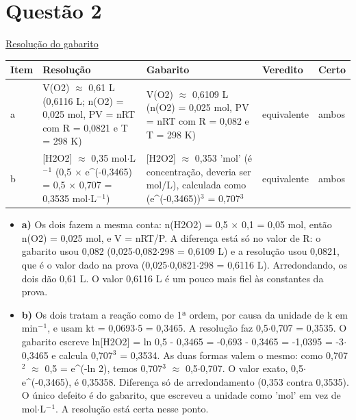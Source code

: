 \documentclass{article}%
\begin{document}
\section*{Questão 2}%
\href{https://poliedroresolve.sistemapoliedro.com.br/vestibulares/ita/2026/ita-2-fase-dia-2-29-10-2025-2-fase-dia-2/dissertativa-2-quimica-2-fase-dia-2-ita-2026}{Resolução do gabarito}\par\smallskip%
\begin{longtable}{@{}p{} p{} p{} p{} p{}@{}}\toprule Item & Resolução & Gabarito & Veredito & Certo \\ \midrule
a & V(O2) $\approx$ 0,61 L (0,6116 L; n(O2) = 0,025 mol, PV = nRT com R = 0,0821 e T = 298 K) & V(O2) $\approx$ 0,6109 L (n(O2) = 0,025 mol, PV = nRT com R = 0,082 e T = 298 K) & equivalente & ambos \\
b & {[}H2O2{]} $\approx$ 0,35 mol$\cdot$L$^{-}$$^{1}$ (0,5 $\times$ e\^{}(-0,3465) = 0,5 $\times$ 0,707 = 0,3535 mol$\cdot$L$^{-}$$^{1}$) & {[}H2O2{]} $\approx$ 0,353 'mol' (é concentração, deveria ser mol/L), calculada como (e\^{}(-0,3465))$^3$ = 0,707$^3$ & equivalente & ambos \\
\bottomrule\end{longtable}%
\begin{itemize}%
\item%
\textbf{a)} Os dois fazem a mesma conta: n(H2O2) = 0,5 $\times$ 0,1 = 0,05 mol, então n(O2) = 0,025 mol, e V = nRT/P. A diferença está só no valor de R: o gabarito usou 0,082 (0,025$\cdot$0,082$\cdot$298 = 0,6109 L) e a resolução usou 0,0821, que é o valor dado na prova (0,025$\cdot$0,0821$\cdot$298 = 0,6116 L). Arredondando, os dois dão 0,61 L. O valor 0,6116 L é um pouco mais fiel às constantes da prova.%
\item%
\textbf{b)} Os dois tratam a reação como de 1ª ordem, por causa da unidade de k em min$^{-}$$^{1}$, e usam kt = 0,0693$\cdot$5 = 0,3465. A resolução faz 0,5$\cdot$0,707 = 0,3535. O gabarito escreve ln{[}H2O2{]} = ln 0,5 - 0,3465 = -0,693 - 0,3465 = -1,0395 = -3$\cdot$0,3465 e calcula 0,707$^3$ = 0,3534. As duas formas valem o mesmo: como 0,707$^2$ $\approx$ 0,5 = e\^{}(-ln 2), temos 0,707$^3$ $\approx$ 0,5$\cdot$0,707. O valor exato, 0,5$\cdot$e\^{}(-0,3465), é 0,35358. Diferença só de arredondamento (0,353 contra 0,3535). O único defeito é do gabarito, que escreveu a unidade como 'mol' em vez de mol$\cdot$L$^{-}$$^{1}$. A resolução está certa nesse ponto.%
\end{itemize}%
\end{document}

